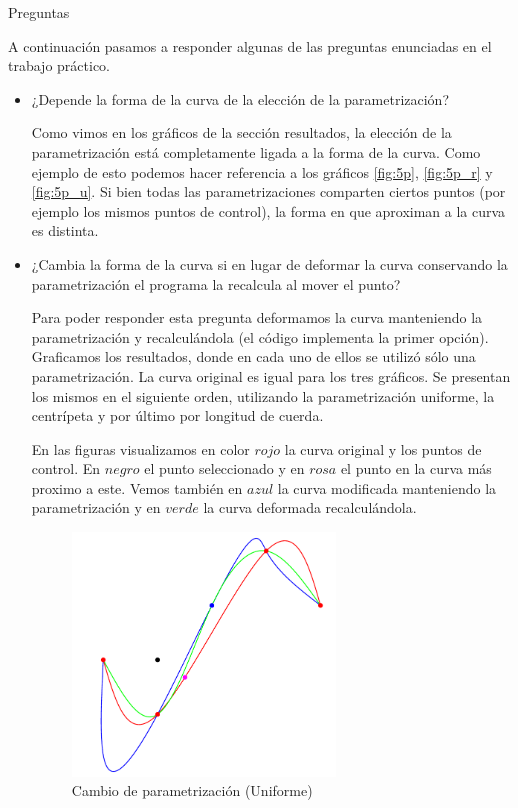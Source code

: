 \begin{section}{Preguntas}

A continuación pasamos a responder algunas de las preguntas enunciadas en el trabajo práctico.
\begin{itemize}
	\item ¿Depende la forma de la curva de la elección de la parametrización?
	
		Como vimos en los gráficos de la sección resultados, la elección de la parametrización está completamente ligada a la forma de la curva. Como ejemplo de esto podemos hacer referencia a los gráficos \ref{fig:5p}, \ref{fig:5p_r} y \ref{fig:5p_u}. Si bien todas las parametrizaciones comparten ciertos puntos (por ejemplo los mismos puntos de control), la forma en que aproximan a la curva es distinta.

	\item ¿Cambia la forma de la curva si en lugar de deformar la curva conservando la parametrización el programa la recalcula al mover el punto?

	Para poder responder esta pregunta deformamos la curva manteniendo la parametrización y recalculándola (el código implementa la primer opción). Graficamos los resultados, donde en cada uno de ellos se utilizó sólo una parametrización. La curva original es igual para los tres gráficos.
	Se presentan los mismos en el siguiente orden, utilizando la parametrización uniforme, la centrípeta y por último por longitud de cuerda.
	
	En las figuras visualizamos en color $rojo$ la curva original y los puntos de control. En $negro$ el punto seleccionado y en $rosa$ el punto en la curva más proximo a este.
	Vemos también en $azul$ la curva modificada manteniendo la parametrización y en $verde$ la curva deformada recalculándola.
	\begin{figure}[H]
		  \centering
			\includegraphics[width=7cm]{graficos/paramVSreparamUniform.pdf}
		  \caption{Cambio de parametrización (Uniforme)}
		  \label{fig:paramChangeUniform}
	\end{figure}
	

\end{itemize}
\end{section}
